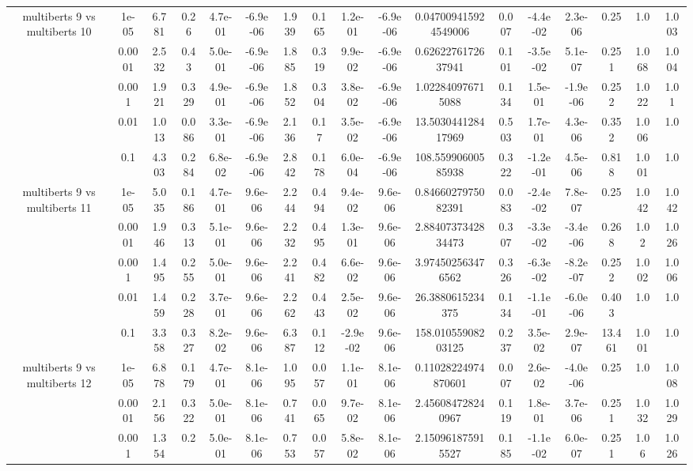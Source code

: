 \begin{tabular}{|c|c|c|c|c|c|c|c|c|c|c|c|c|c|c|c|c|}
\hline
\multirow{5}{*}{multiberts 9 vs multiberts 10} & 1e-05 & 6.781 & 0.26 & 4.7e-01 & -6.9e-06 & 1.939 & 0.165 & 1.2e-01 & -6.9e-06 & 0.047009415924549006 & 0.007 & -4.4e-02 & 2.3e-06 & 0.25 & 1.0 & 1.003 \\
 & 0.0001 & 2.532 & 0.43 & 5.0e-01 & -6.9e-06 & 1.885 & 0.319 & 9.9e-02 & -6.9e-06 & 0.6262276172637941 & 0.101 & -3.5e-02 & 5.1e-07 & 0.251 & 1.068 & 1.004 \\
 & 0.001 & 1.921 & 0.329 & 4.9e-01 & -6.9e-06 & 1.852 & 0.304 & 3.8e-02 & -6.9e-06 & 1.022840976715088 & 0.134 & 1.5e-01 & -1.9e-06 & 0.252 & 1.022 & 1.01 \\
 & 0.01 & 1.013 & 0.086 & 3.3e-01 & -6.9e-06 & 2.136 & 0.17 & 3.5e-02 & -6.9e-06 & 13.503044128417969 & 0.503 & 1.7e-01 & 4.3e-06 & 0.352 & 1.006 & 1.0 \\
 & 0.1 & 4.303 & 0.284 & 6.8e-02 & -6.9e-06 & 2.842 & 0.178 & 6.0e-04 & -6.9e-06 & 108.55990600585938 & 0.322 & -1.2e-01 & 4.5e-06 & 0.818 & 1.001 & 1.0 \\
\hline
\multirow{5}{*}{multiberts 9 vs multiberts 11} & 1e-05 & 5.035 & 0.186 & 4.7e-01 & 9.6e-06 & 2.244 & 0.494 & 9.4e-02 & 9.6e-06 & 0.8466027975082391 & 0.083 & -2.4e-02 & 7.8e-07 & 0.25 & 1.042 & 1.042 \\
 & 0.0001 & 1.946 & 0.313 & 5.1e-01 & 9.6e-06 & 2.232 & 0.495 & 1.3e-01 & 9.6e-06 & 2.8840737342834473 & 0.307 & -3.3e-02 & -3.4e-06 & 0.268 & 1.02 & 1.026 \\
 & 0.001 & 1.495 & 0.255 & 5.0e-01 & 9.6e-06 & 2.241 & 0.482 & 6.6e-02 & 9.6e-06 & 3.974502563476562 & 0.326 & -6.3e-02 & -8.2e-07 & 0.252 & 1.002 & 1.006 \\
 & 0.01 & 1.459 & 0.228 & 3.7e-01 & 9.6e-06 & 2.262 & 0.443 & 2.5e-02 & 9.6e-06 & 26.3880615234375 & 0.134 & -1.1e-01 & -6.0e-06 & 0.403 & 1.0 & 1.0 \\
 & 0.1 & 3.358 & 0.327 & 8.2e-02 & 9.6e-06 & 6.387 & 0.112 & -2.9e-02 & 9.6e-06 & 158.01055908203125 & 0.237 & 3.5e-02 & 2.9e-07 & 13.461 & 1.001 & 1.0 \\
\hline
\multirow{5}{*}{multiberts 9 vs multiberts 12} & 1e-05 & 6.878 & 0.179 & 4.7e-01 & 8.1e-06 & 1.095 & 0.057 & 1.1e-01 & 8.1e-06 & 0.11028224974870601 & 0.007 & 2.6e-02 & -4.0e-06 & 0.25 & 1.0 & 1.008 \\
 & 0.0001 & 2.156 & 0.322 & 5.0e-01 & 8.1e-06 & 0.741 & 0.065 & 9.7e-02 & 8.1e-06 & 2.456084728240967 & 0.119 & 1.8e-01 & 3.7e-06 & 0.251 & 1.032 & 1.029 \\
 & 0.001 & 1.354 & 0.2 & 5.0e-01 & 8.1e-06 & 0.753 & 0.057 & 5.8e-02 & 8.1e-06 & 2.150961875915527 & 0.185 & -1.1e-02 & 6.0e-07 & 0.251 & 1.06 & 1.026 \\

\end{tabular}
